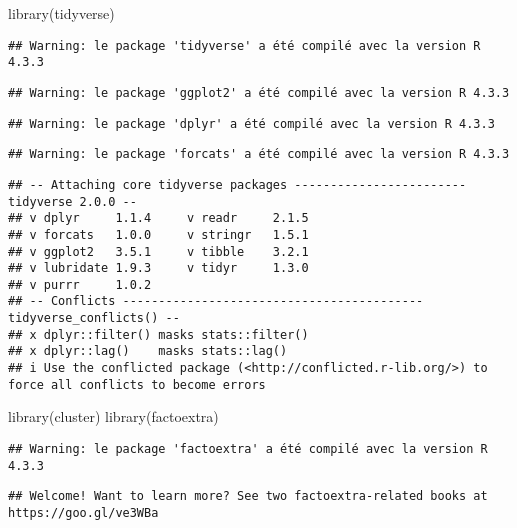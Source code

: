 \documentclass[
]{article}
\author{}
\date{\vspace{-2.5em}}
\newenvironment{Shaded}{\begin{snugshade}}{\end{snugshade}}
\newcommand{\FunctionTok}[1]{\textcolor[rgb]{0.00,0.00,0.00}{#1}}
\newcommand{\NormalTok}[1]{#1}
\begin{document}
\begin{Shaded}
\begin{Highlighting}[]
\FunctionTok{library}\NormalTok{(tidyverse)}
\end{Highlighting}
\end{Shaded}

\begin{verbatim}
## Warning: le package 'tidyverse' a été compilé avec la version R 4.3.3
\end{verbatim}

\begin{verbatim}
## Warning: le package 'ggplot2' a été compilé avec la version R 4.3.3
\end{verbatim}

\begin{verbatim}
## Warning: le package 'dplyr' a été compilé avec la version R 4.3.3
\end{verbatim}

\begin{verbatim}
## Warning: le package 'forcats' a été compilé avec la version R 4.3.3
\end{verbatim}

\begin{verbatim}
## -- Attaching core tidyverse packages ------------------------ tidyverse 2.0.0 --
## v dplyr     1.1.4     v readr     2.1.5
## v forcats   1.0.0     v stringr   1.5.1
## v ggplot2   3.5.1     v tibble    3.2.1
## v lubridate 1.9.3     v tidyr     1.3.0
## v purrr     1.0.2     
## -- Conflicts ------------------------------------------ tidyverse_conflicts() --
## x dplyr::filter() masks stats::filter()
## x dplyr::lag()    masks stats::lag()
## i Use the conflicted package (<http://conflicted.r-lib.org/>) to force all conflicts to become errors
\end{verbatim}

\begin{Shaded}
\begin{Highlighting}[]
\FunctionTok{library}\NormalTok{(cluster)}
\FunctionTok{library}\NormalTok{(factoextra)}
\end{Highlighting}
\end{Shaded}

\begin{verbatim}
## Warning: le package 'factoextra' a été compilé avec la version R 4.3.3
\end{verbatim}

\begin{verbatim}
## Welcome! Want to learn more? See two factoextra-related books at https://goo.gl/ve3WBa
\end{verbatim}
\end{document}
